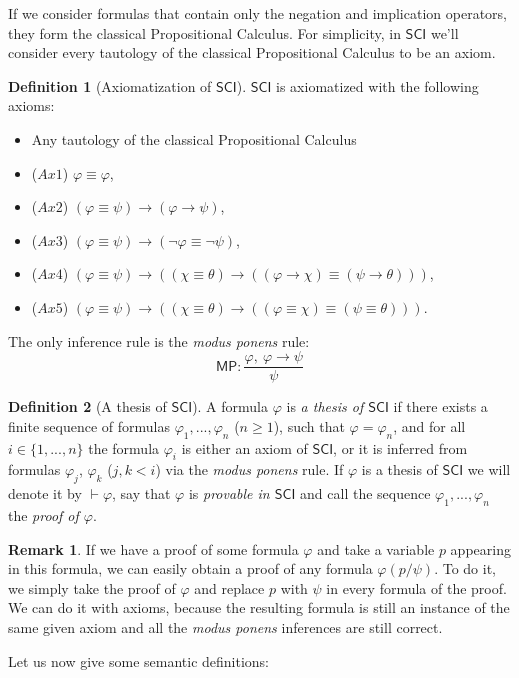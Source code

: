 \documentclass{article}
\theoremstyle{definition}
\newtheorem{definition}{Definition}[section]
\theoremstyle{definition}
\theoremstyle{definition}
\newtheorem{remark}{Remark}[section]
\newcommand*{\id}{\equiv}
\newcommand*{\ra}{\rightarrow}
\newcommand{\SCI}{$\mathsf{SCI}$\xspace}
\begin{document}
If we consider formulas that contain only the negation and implication
operators, they form the classical Propositional Calculus. For simplicity, in
\SCI we'll consider every tautology of the classical Propositional Calculus to
be an axiom.

\begin{definition}[Axiomatization of \SCI]
    \label{axiomatization}
    \SCI is axiomatized with the following axioms:
    \begin{itemize}
        \item Any tautology of the classical Propositional Calculus
        \item ($Ax1$) $\varphi \id \varphi$,
        \item ($Ax2$) $(\varphi \id \psi) \ra (\varphi \ra \psi)$,
        \item ($Ax3$) $(\varphi \id \psi) \ra (\lnot \varphi \id \lnot \psi)$,
        \item ($Ax4$) $(\varphi \id \psi) \ra ((\chi \id \theta) \ra ((\varphi \ra \chi) \id (\psi \ra \theta)))$,
        \item ($Ax5$) $(\varphi \id \psi) \ra ((\chi \id \theta) \ra ((\varphi \id \chi) \id (\psi \id \theta)))$.
    \end{itemize}
    The only inference rule is the \emph{modus ponens} rule:
    $$
        \mathsf{MP}: \frac{
            \varphi, \ \varphi \ra \psi}%
        { \psi }
    $$
\end{definition}

\begin{definition}[A thesis of \SCI]
    A formula $\varphi$ is \emph{a thesis of \SCI} if there exists a finite sequence of formulas $\varphi_1, ..., \varphi_n$ ($n \geq 1$), such that $\varphi = \varphi_n$, and for all $i \in \{1, ..., n\}$ the formula $\varphi_i$ is either an axiom of \SCI, or it is inferred from formulas $\varphi_j$, $\varphi_k$ ($j, k <i$) via the \emph{modus ponens} rule. If $\varphi$ is a thesis of \SCI we will denote it by $\vdash \varphi$, say that $\varphi$ is \emph{provable in \SCI} and call the sequence $\varphi_1, ..., \varphi_n$ the \emph{proof of $\varphi$}.
    \label{thesis}
\end{definition}
%
\begin{remark}
    \label{remark_proof_varphi}
    If we have a proof of some formula $\varphi$ and take a variable $p$ appearing in this formula, we can easily obtain a proof of any formula $\varphi(p/\psi)$. To do it, we simply take the proof of $\varphi$ and replace $p$ with $\psi$ in every formula of the proof. We can do it with axioms, because the resulting formula is still an instance of the same given axiom and all the \emph{modus ponens} inferences are still correct.
\end{remark}
%
Let us now give some semantic definitions:
\end{document}
